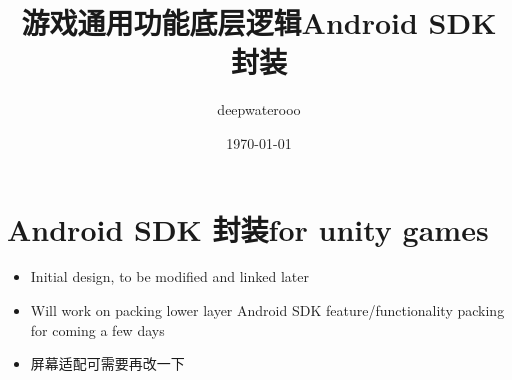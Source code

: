 \documentclass[9pt, b5paper]{article}
\author{deepwaterooo}
\date{\today}
\title{游戏通用功能底层逻辑Android SDK 封装}
\begin{document}
\maketitle
\tableofcontents


\section{Android SDK 封装for unity games}
\label{sec-1}
\begin{itemize}
\item Initial design, to be modified and linked later
\item Will work on packing lower layer Android SDK feature/functionality packing for coming a few days
\item 屏幕适配可需要再改一下
\end{itemize}
\end{document}
